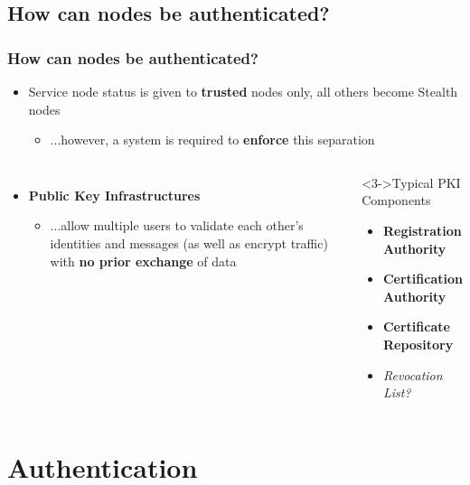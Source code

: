 \documentclass{beamer}
\begin{document}
\subsection{How can nodes be authenticated?}
\begin{frame}
  \frametitle{How can nodes be authenticated?}

  \begin{itemize}
  \item{Service node status is given to \textbf{trusted} nodes only, all others become Stealth nodes}
    \begin{itemize}
    \item{...however, a system is required to \textbf{enforce} this separation}
    \end{itemize}
  \end{itemize}

  \begin{columns}



    \column{6cm}

  \begin{itemize}
  \item<2->{\textbf{Public Key Infrastructures}}
    \begin{itemize}
    \item{...allow multiple users to validate each other's identities and messages (as well as encrypt traffic) with \textbf{no prior exchange} of data}
    \end{itemize}
  \end{itemize}

  \column{5.0cm}
  \begin{block}<3->{Typical PKI Components}
    \begin{itemize}
    \item{\textbf{Registration Authority}}
    \item{\textbf{Certification Authority}}
    \item{\textbf{Certificate Repository}}
    \item{\it{Revocation List?}}
    \end{itemize}
  \end{block}

  \end{columns}

\end{frame}

\section{Authentication}
\end{document}
